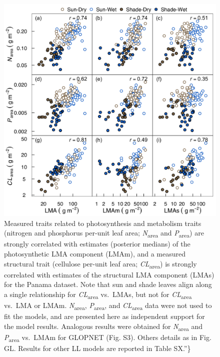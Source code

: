 \documentclass[
  12pt,
]{article}
\begin{document}
\begin{figure}
\hypertarget{fig:PA-NPC}{%
\centering
\includegraphics{../figs/PA_NPC.png}
\caption{Measured traits related to photosynthesis and metabolism traits (nitrogen and phosphorus per-unit leaf area; \emph{N}\textsubscript{area} and \emph{P}\textsubscript{area}) are strongly correlated with estimates (posterior medians) of the photosynthetic LMA component (LMAm), and a measured structural trait (cellulose per-unit leaf area; \emph{CL}\textsubscript{area}) is strongly correlated with estimates of the structural LMA component (LMAs) for the Panama dataset.
Note that sun and shade leaves align along a single relationship for \emph{CL}\textsubscript{area} vs.~LMAs, but not for \emph{CL}\textsubscript{area} vs.~LMA or LMAm. \emph{N}\textsubscript{area}, \emph{P}\textsubscript{area}, and \emph{CL}\textsubscript{area} data were not used to fit the models, and are presented here as independent support for the model results.
Analogous results were obtained for \emph{N}\textsubscript{area} and \emph{P}\textsubscript{area} vs.~LMAm for GLOPNET (Fig. S3).
Others details as in Fig. GL.
Results for other LL models are reported in Table SX.''\}}\label{fig:PA-NPC}
}
\end{figure}
\end{document}
